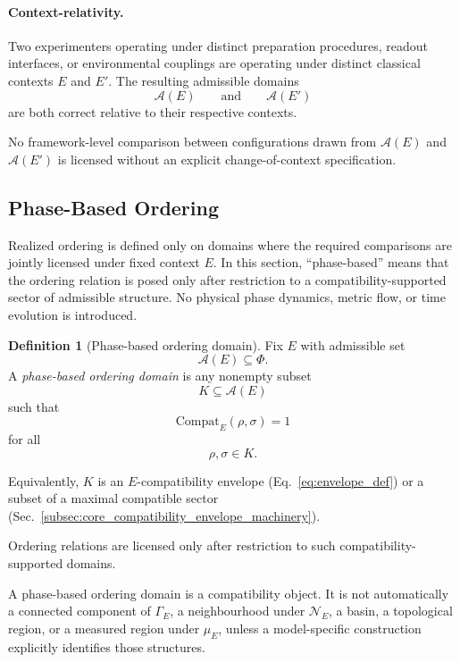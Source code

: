 \documentclass[aps,prx,onecolumn,11pt]{revtex4-2}
\theoremstyle{plain}
\theoremstyle{definition}
\newtheorem{definition}{Definition}
\theoremstyle{remark}
\begin{document}
\paragraph{Context-relativity.}

Two experimenters operating under distinct preparation procedures,
readout interfaces, or environmental couplings are operating under
distinct classical contexts \(E\) and \(E'\). The resulting admissible
domains
\[
\mathcal A(E)
\qquad\text{and}\qquad
\mathcal A(E')
\]
are both correct relative to their respective contexts.

No framework-level comparison between configurations drawn from
\(\mathcal A(E)\) and \(\mathcal A(E')\) is licensed without an explicit
change-of-context specification.

\subsection{Phase-Based Ordering}
\label{subsec:phase_based_ordering}

Realized ordering is defined only on domains where the required
comparisons are jointly licensed under fixed context \(E\). In this
section, ``phase-based'' means that the ordering relation is posed only
after restriction to a compatibility-supported sector of admissible
structure. No physical phase dynamics, metric flow, or time evolution is
introduced.

\begin{definition}[Phase-based ordering domain]
\label{def:phase_based_ordering}
Fix \(E\) with admissible set
\[
\mathcal A(E)\subseteq\Phi.
\]
A \emph{phase-based ordering domain} is any nonempty subset
\[
K\subseteq\mathcal A(E)
\]
such that
\[
\mathrm{Compat}_E(\rho,\sigma)=1
\]
for all
\[
\rho,\sigma\in K.
\]

Equivalently, \(K\) is an \(E\)-compatibility envelope
(Eq.~\ref{eq:envelope_def}) or a subset of a maximal compatible sector
(Sec.~\ref{subsec:core_compatibility_envelope_machinery}).

Ordering relations are licensed only after restriction to such
compatibility-supported domains.
\end{definition}

A phase-based ordering domain is a compatibility object. It is not
automatically a connected component of \(\Gamma_E\), a neighbourhood
under \(\mathcal N_E\), a basin, a topological region, or a measured
region under \(\mu_E\), unless a model-specific construction explicitly
identifies those structures.
\end{document}
